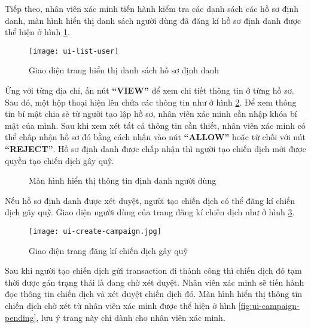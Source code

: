 \documentclass[../main-report.tex]{subfiles}
\begin{document}
Tiếp theo, nhân viên xác minh tiến hành kiểm tra các danh sách các hồ sơ định danh, màn hình hiển thị danh sách người dùng đã đăng kí hồ sơ định danh được thể hiện ở hình \ref{fig:ui-list-user}.

\begin{figure}[ht!]
\begin{center}
\label{fig:ui-list-user}
\texttt{[image: ui-list-user]}
\caption{Giao diện trang hiển thị danh sách hồ sơ định danh}
\end{center}
\end{figure}

Ứng với từng địa chỉ, ấn nút \textbf{``VIEW''} để xem chi tiết thông tin ở từng hồ sơ. Sau đó, một hộp thoại hiện lên chứa các thông tin như ở hình \ref{fig:ui-identity-view}. Để xem thông tin bí mật chia sẻ từ người tạo lập hồ sơ, nhân viên xác minh cần nhập khóa bí mật của mình. Sau khi xem xét tất cả thông tin cần thiết, nhân viên xác minh có thể chấp nhận hồ sơ đó bằng cách nhấn vào nút \textbf{``ALLOW''} hoặc từ chối với nút \textbf{``REJECT''}. Hồ sơ định danh được chấp nhận thì người tạo chiến dịch mới được quyền tạo chiến dịch gây quỹ.

\begin{figure}[ht!]
\begin{center}
\label{fig:ui-identity-view}
\caption{Màn hình hiển thị thông tin định danh người dùng}
\end{center}
\end{figure}

Nếu hồ sơ định danh được xét duyệt, người tạo chiến dịch có thể đăng kí chiến dịch gây quỹ. Giao diện người dùng của trang đăng kí chiến dịch như ở hình \ref{fig:ui-create-campaign}.

\begin{figure}[ht!]
\begin{center}
\label{fig:ui-create-campaign}
\texttt{[image: ui-create-campaign.jpg]}
\caption{Giao diện trang đăng kí chiến dịch gây quỹ}
\end{center}
\end{figure}

Sau khi người tạo chiến dịch gửi transaction đi thành công thì chiến dịch đó tạm thời được gán trạng thái là đang chờ xét duyệt. Nhân viên xác minh sẽ tiến hành đọc thông tin chiến dịch và xét duyệt chiến dịch đó. Màn hình hiển thị thông tin chiến dịch chờ xét từ nhân viên xác minh được thể hiện ở hình \ref{fig:ui-campaign-pending}, lưu ý trang này chỉ dành cho nhân viên xác minh.
\end{document}
